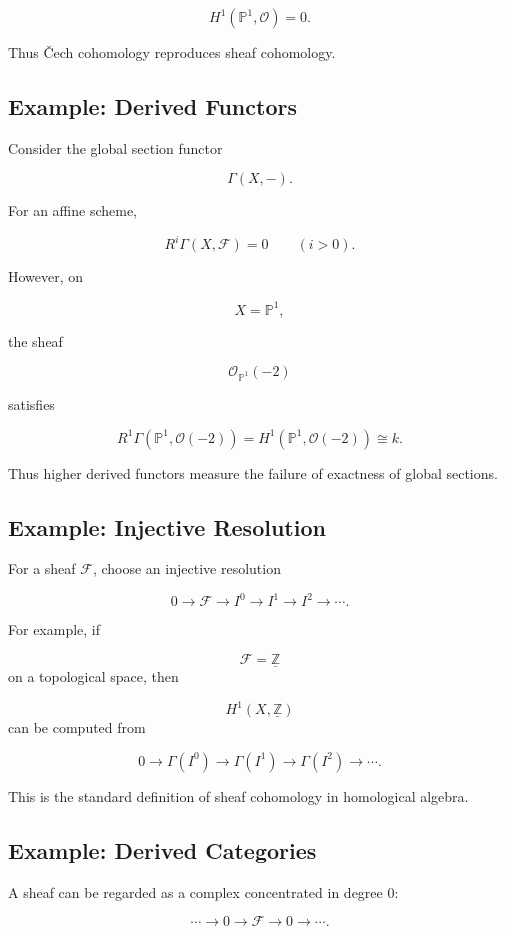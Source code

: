 \documentclass[12pt,a4paper]{article}
\theoremstyle{notespace}
\begin{document}
\[
H^1(\mathbb P^1,\mathcal O)
=
0.
\]

Thus \v{C}ech cohomology reproduces sheaf cohomology.

\subsection{Example: Derived Functors}

Consider the global section functor

\[
\Gamma(X,-).
\]

For an affine scheme,

\[
R^i\Gamma(X,\mathcal F)=0
\qquad
(i>0).
\]

However, on

\[
X=\mathbb P^1,
\]

the sheaf

\[
\mathcal O_{\mathbb P^1}(-2)
\]

satisfies

\[
R^1\Gamma(\mathbb P^1,\mathcal O(-2))
=
H^1(\mathbb P^1,\mathcal O(-2))
\cong k.
\]

Thus higher derived functors measure the failure of exactness of global sections.

\subsection{Example: Injective Resolution}

For a sheaf \(\mathcal F\), choose an injective resolution

\[
0
\to
\mathcal F
\to
I^0
\to
I^1
\to
I^2
\to
\cdots .
\]

For example, if

\[
\mathcal F=\underline{\mathbb Z}
\]
on a topological space, then

\[
H^1(X,\underline{\mathbb Z})
\]
can be computed from

\[
0
\to
\Gamma(I^0)
\to
\Gamma(I^1)
\to
\Gamma(I^2)
\to
\cdots .
\]

This is the standard definition of sheaf cohomology in homological algebra.

\subsection{Example: Derived Categories}

A sheaf can be regarded as a complex concentrated in degree \(0\):

\[
\cdots
\to
0
\to
\mathcal F
\to
0
\to
\cdots .
\]
\end{document}
